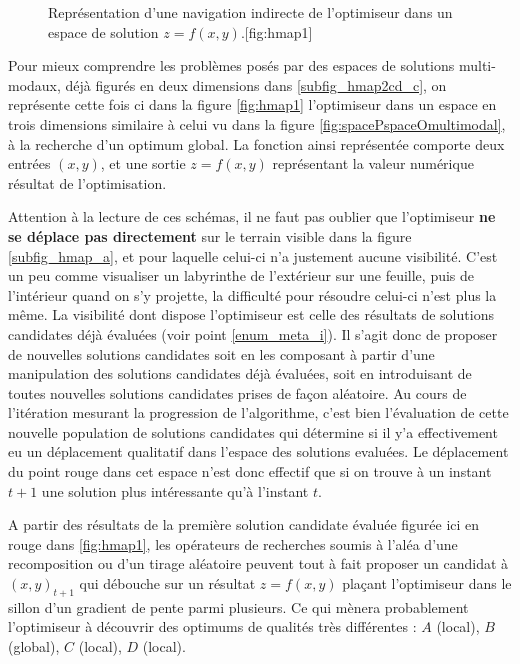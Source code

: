 \begin{figure}[!htbp]
\begin{sidecaption}[fortoc]{Représentation d'une navigation indirecte de l'optimiseur dans un espace de solution $z = f(x,y)$.}[fig:hmap1]
  \centering
  \qquad
\end{sidecaption}
\end{figure}

Pour mieux comprendre les problèmes posés par des espaces de solutions multi-modaux, déjà figurés en deux dimensions dans \ref{subfig_hmap2cd_c}, on représente cette fois ci dans la figure \ref{fig:hmap1} l'optimiseur dans un espace en trois dimensions similaire à celui vu dans la figure \ref{fig:spacePspaceOmultimodal}, à la recherche d'un optimum global. La fonction ainsi représentée comporte deux entrées $(x,y)$, et une sortie $z = f(x,y)$ représentant la valeur numérique résultat de l'optimisation.

Attention à la lecture de ces schémas, il ne faut pas oublier que l'optimiseur \textbf{ne se déplace pas directement} sur le terrain visible dans la figure \ref{subfig_hmap_a}, et pour laquelle celui-ci n'a justement aucune visibilité. C'est un peu comme visualiser un labyrinthe de l'extérieur sur une feuille, puis de l'intérieur quand on s'y projette, la difficulté pour résoudre celui-ci n'est plus la même. La visibilité dont dispose l'optimiseur est celle des résultats de solutions candidates déjà évaluées (voir point \ref{enum_meta_i}). Il s'agit donc de proposer de nouvelles solutions candidates soit en les composant à partir d'une manipulation des solutions candidates déjà évaluées, soit en introduisant de toutes nouvelles solutions candidates prises de façon aléatoire. Au cours de l'itération mesurant la progression de l'algorithme, c'est bien l'évaluation de cette nouvelle population de solutions candidates qui détermine si il y'a effectivement eu un déplacement qualitatif dans l'espace des solutions evaluées. Le déplacement du point rouge dans cet espace n'est donc effectif que si on trouve à un instant $t + 1$ une solution plus intéressante qu'à l'instant $t$.

A partir des résultats de la première solution candidate évaluée figurée ici en rouge dans \ref{fig:hmap1}, les opérateurs de recherches soumis à l'aléa d'une recomposition ou d'un tirage aléatoire peuvent tout à fait proposer un candidat à $(x,y)_{t+1}$ qui débouche sur un résultat $z = f(x,y)$ plaçant l'optimiseur dans le sillon d'un gradient de pente parmi plusieurs. Ce qui mènera probablement l'optimiseur à découvrir des optimums de qualités très différentes : $A$ (local), $B$ (global), $C$ (local), $D$ (local).

